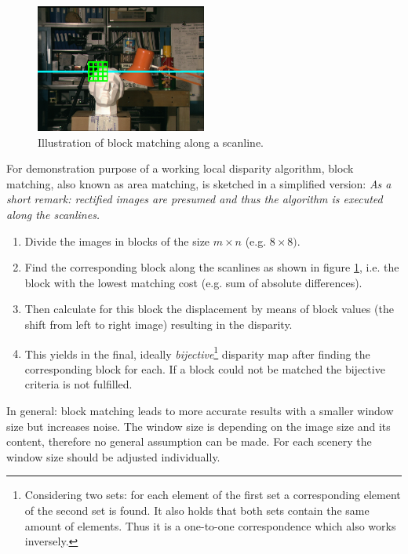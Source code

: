 \begin{figure}[h!]
  \centering
  \includegraphics[width=0.5\textwidth]{src/images/tsukuba-block.png}
  \caption{Illustration of block matching along a scanline.}
  \label{fig:tsukuba-block}
\end{figure}

\noindent For demonstration purpose of a working local disparity algorithm, block matching, also known as area matching, is sketched in a simplified version:
\newline\newline\noindent \textit{As a short remark: rectified images are presumed and thus the algorithm is executed along the scanlines.}

\begin{enumerate}
  \item Divide the images in blocks of the size $m \times n$ (e.g. $8 \times 8)$.
  \item Find the corresponding block along the scanlines as shown in figure \ref{fig:tsukuba-block}, i.e. the block with the lowest matching cost (e.g. sum of absolute differences).
  \item Then calculate for this block the displacement by means of block values (the shift from left to right image) resulting in the disparity.
  \item This yields in the final, ideally \textit{bijective}\footnote{Considering two sets: for each element of the first set a corresponding element of the second set is found. It also holds that both sets contain the same amount of elements. Thus it is a one-to-one correspondence which also works inversely.} disparity map after finding the corresponding block for each. If a block could not be matched the bijective criteria is not fulfilled.
\end{enumerate}

\noindent In general: block matching leads to more accurate results with a smaller window size but increases noise.
The window size is depending on the image size and its content, therefore no general assumption can be made.
For each scenery the window size should be adjusted individually.

